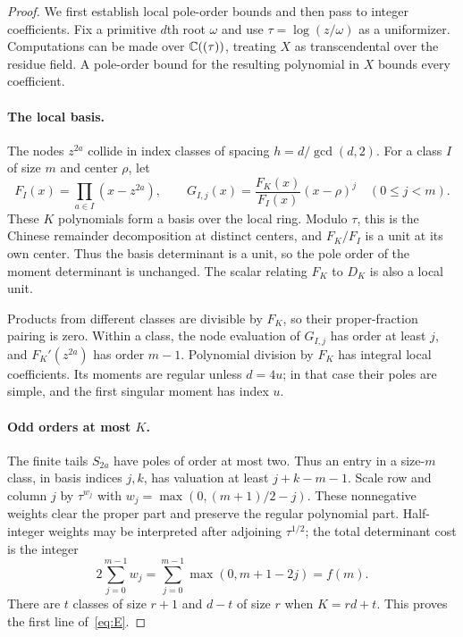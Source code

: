 \documentclass[11pt,letterpaper]{article}
\numberwithin{equation}{section}
\theoremstyle{remark}\newtheorem{remark}[theorem]{Remark}
\begin{document}
\begin{proof}
We first establish local pole-order bounds and then pass to integer coefficients. Fix a primitive $d$th root $\omega$ and use $\tau=\log(z/\omega)$ as a uniformizer. Computations can be made over $\mathbb C((\tau))$, treating $X$ as transcendental over the residue field. A pole-order bound for the resulting polynomial in $X$ bounds every coefficient.

\paragraph{The local basis.}
The nodes $z^{2a}$ collide in index classes of spacing $h=d/\gcd(d,2)$. For a class $I$ of size $m$ and center $\rho$, let
\begin{equation*}
 F_I(x)=\prod_{a\in I}(x-z^{2a}),\qquad
 G_{I,j}(x)=\frac{F_K(x)}{F_I(x)}(x-\rho)^j\quad(0\le j<m).
\end{equation*}
These $K$ polynomials form a basis over the local ring. Modulo $\tau$, this is the Chinese remainder decomposition at distinct centers, and $F_K/F_I$ is a unit at its own center. Thus the basis determinant is a unit, so the pole order of the moment determinant is unchanged. The scalar relating $F_K$ to $D_K$ is also a local unit.

Products from different classes are divisible by $F_K$, so their proper-fraction pairing is zero. Within a class, the node evaluation of $G_{I,j}$ has order at least $j$, and $F_K'(z^{2a})$ has order $m-1$. Polynomial division by $F_K$ has integral local coefficients. Its moments are regular unless $d=4u$; in that case their poles are simple, and the first singular moment has index $u$.

\paragraph{Odd orders at most $K$.}
The finite tails $S_{2a}$ have poles of order at most two. Thus an entry in a size-$m$ class, in basis indices $j,k$, has valuation at least $j+k-m-1$. Scale row and column $j$ by $\tau^{w_j}$ with
$w_j=\max(0,(m+1)/2-j)$. These nonnegative weights clear the proper part and preserve the regular polynomial part. Half-integer weights may be interpreted after adjoining $\tau^{1/2}$; the total determinant cost is the integer
\begin{equation*}
 2\sum_{j=0}^{m-1}w_j
 =\sum_{j=0}^{m-1}\max(0,m+1-2j)=f(m).
\end{equation*}
There are $t$ classes of size $r+1$ and $d-t$ of size $r$ when $K=rd+t$. This proves the first line of~\eqref{eq:E}.


\end{proof}
\end{document}
